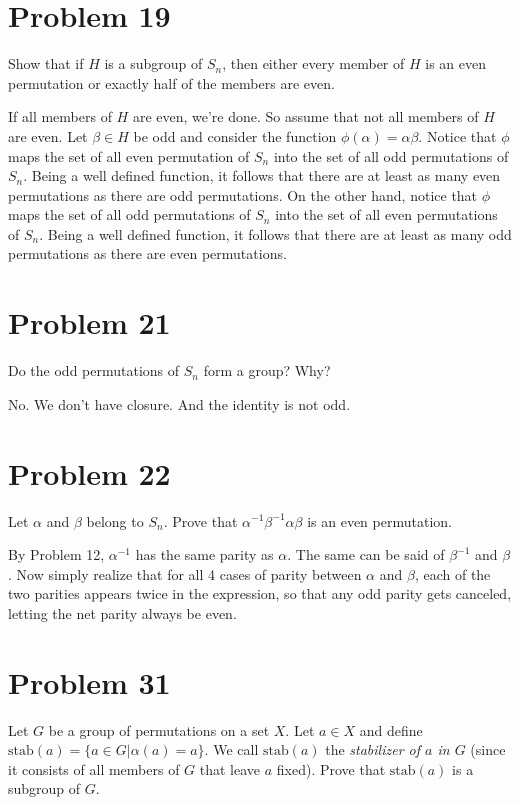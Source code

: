 \documentclass[12pt]{article}
\newcommand{\stab}{\mbox{stab}}
\begin{document}
\section*{Problem 19}

Show that if $H$ is a subgroup of $S_n$, then either every member of $H$ is an
even permutation or exactly half of the members are even.

If all members of $H$ are even, we're done.  So assume that not all
members of $H$ are even.  Let $\beta\in H$ be odd and
consider the function $\phi(\alpha)=\alpha\beta$.  Notice that $\phi$
maps the set of all even permutation of $S_n$ into the set of all
odd permutations of $S_n$.  Being a well defined function, it follows
that there are at least as many even permutations as there are
odd permutations.  On the other hand, notice that $\phi$ maps
the set of all odd permutations of $S_n$ into the set of all even
permutations of $S_n$.  Being a well defined function, it follows
that there are at least as many odd permutations as there are
even permutations.

\section*{Problem 21}

Do the odd permutations of $S_n$ form a group?  Why?

No.  We don't have closure.  And the identity is not odd.

\section*{Problem 22}

Let $\alpha$ and $\beta$ belong to $S_n$.  Prove that $\alpha^{-1}\beta^{-1}\alpha\beta$ is an even permutation.

By Problem 12, $\alpha^{-1}$ has the same parity as $\alpha$.  The same
can be said of $\beta^{-1}$ and $\beta$.  Now simply realize that for all
4 cases of parity between $\alpha$ and $\beta$, each of the two parities
appears twice in the expression, so that any odd parity gets canceled,
letting the net parity always be even.

\section*{Problem 31}

Let $G$ be a group of permutations on a set $X$.  Let $a\in X$ and
define $\stab(a)=\{a\in G|\alpha(a)=a\}$.  We call $\stab(a)$ the {\it stabilizer
of $a$ in $G$} (since it consists of all members of $G$ that leave $a$ fixed).  Prove that
$\stab(a)$ is a subgroup of $G$.
\end{document}
